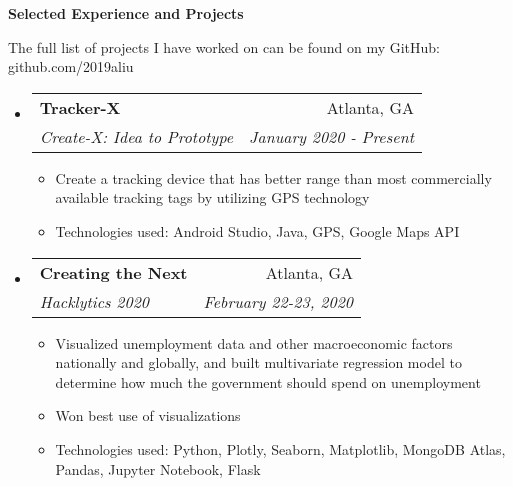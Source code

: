 \documentclass[letterpaper,10pt]{article}
\makeatletter
\newcommand{\resitem}[1]{\item #1 \vspace{-2pt}}
\newcommand{\resheading}[1]{{\large \colorbox{mygrey}{\begin{minipage}{\textwidth}{\textbf{#1 \vphantom{p\^{E}}}}\end{minipage}}}}
\newcommand{\ressubheading}[4]{
\begin{tabular*}{7.0in}{l@{\extracolsep{\fill}}r}
		\textbf{#1} & #2 \\
		\textit{#3} & \textit{#4} \\
\end{tabular*}\vspace{-6pt}}
\makeatother
\begin{document}
\resheading{Selected Experience and Projects}

\vspace{1em}
The full list of projects I have worked on can be found on my GitHub: github.com/2019aliu

\begin{itemize}
\item
    \ressubheading{Tracker-X}{Atlanta, GA}{Create-X: Idea to Prototype}{January 2020 - Present}
    \begin{itemize}
        \resitem{Create a tracking device that has better range than most commercially available tracking tags by utilizing GPS technology}
        \resitem{Technologies used: Android Studio, Java, GPS, Google Maps API}
    \end{itemize}
\item
    \ressubheading{Creating the Next}{Atlanta, GA}{Hacklytics 2020}{February 22-23, 2020}
    \begin{itemize}
        \resitem{Visualized unemployment data and other macroeconomic factors nationally and globally, and built multivariate regression model to determine how much the government should spend on unemployment}
        \resitem{Won best use of visualizations}
        \resitem{Technologies used: Python, Plotly, Seaborn, Matplotlib, MongoDB Atlas, Pandas, Jupyter Notebook, Flask}
    \end{itemize}

\end{itemize}
\end{document}
